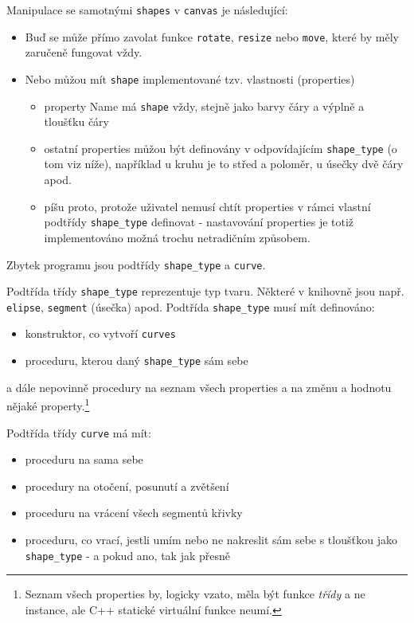 \documentclass[11pt]{article} %
\begin{document}
Manipulace se samotnými \texttt{shapes} v \texttt{canvas} je následující:
\begin{itemize}
    \item Buď se může přímo zavolat funkce \texttt{rotate}, \texttt{resize} nebo \texttt{move}, které by měly zaručeně fungovat vždy.
    \item Nebo můžou mít \texttt{shape} implementované tzv. vlastnosti (properties)
    \begin{itemize}
        \item property Name má \texttt{shape} vždy, stejně jako barvy čáry a výplně a tloušťku čáry
        \item ostatní properties můžou být definovány v odpovídajícím \texttt{shape\_type} (o tom viz níže), například u kruhu je to střed a poloměr, u úsečky dvě čáry apod.
        \item {} píšu proto, protože uživatel nemusí chtít properties v rámci vlastní podtřídy \texttt{shape\_type} definovat - nastavování properties je totiž implementováno možná trochu netradičním způsobem.
    \end{itemize}
\end{itemize}
    
Zbytek programu jsou podtřídy \texttt{shape\_type} a \texttt{curve}.

Podtřída třídy \texttt{shape\_type} reprezentuje typ tvaru. Některé v knihovně jsou např. \texttt{elipse}, \texttt{segment} (úsečka) apod. Podtřída \texttt{shape\_type} musí mít definováno:
\begin{itemize}
    \item konstruktor, co vytvoří \texttt{curves}
    \item proceduru, kterou daný \texttt{shape\_type}  sám sebe
\end{itemize}
a dále nepovinně procedury na seznam všech properties a na změnu a hodnotu nějaké property.\footnote{Seznam všech properties by, logicky vzato, měla být funkce \emph{třídy} a ne instance, ale C++ statické virtuální funkce neumí.}

Podtřída třídy \texttt{curve} má mít:
\begin{itemize}
    \item proceduru na  sama sebe
    \item procedury na otočení, posunutí a zvětšení
    \item proceduru na vrácení všech segmentů křivky 
    \item proceduru, co vrací, jestli umím nebo ne nakreslit sám sebe s tloušťkou jako \texttt{shape\_type} - a pokud ano, tak jak přesně
\end{itemize}
\end{document}

